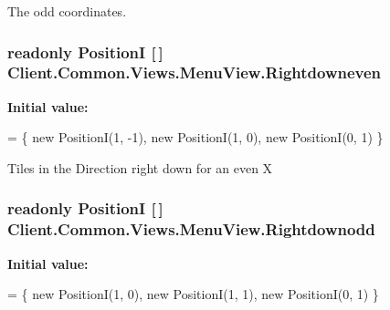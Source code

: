The odd coordinates. 

\hypertarget{classClient_1_1Common_1_1Views_1_1MenuView_ae711e0210073a31a2bf15ad1d77e8478}{}
\subsubsection[{Rightdowneven}]{\setlength{\rightskip}{0pt plus 5cm}readonly {\bf Position\+I} \mbox{[}$\,$\mbox{]} Client.\+Common.\+Views.\+Menu\+View.\+Rightdowneven\hspace{0.3cm}{\ttfamily [static]}}\label{classClient_1_1Common_1_1Views_1_1MenuView_ae711e0210073a31a2bf15ad1d77e8478}
{\bfseries Initial value\+:}
\begin{DoxyCode}
=
            \{
                \textcolor{keyword}{new} PositionI(1, -1),
                \textcolor{keyword}{new} PositionI(1, 0),
                \textcolor{keyword}{new} PositionI(0, 1)
            \}
\end{DoxyCode}


Tiles in the Direction right down for an even X 

\hypertarget{classClient_1_1Common_1_1Views_1_1MenuView_ab2619bc7970cbbdaeba9521561eabe53}{}
\subsubsection[{Rightdownodd}]{\setlength{\rightskip}{0pt plus 5cm}readonly {\bf Position\+I} \mbox{[}$\,$\mbox{]} Client.\+Common.\+Views.\+Menu\+View.\+Rightdownodd\hspace{0.3cm}{\ttfamily [static]}}\label{classClient_1_1Common_1_1Views_1_1MenuView_ab2619bc7970cbbdaeba9521561eabe53}
{\bfseries Initial value\+:}
\begin{DoxyCode}
=
            \{
                \textcolor{keyword}{new} PositionI(1, 0),
                \textcolor{keyword}{new} PositionI(1, 1),
                \textcolor{keyword}{new} PositionI(0, 1)
            \}
\end{DoxyCode}



